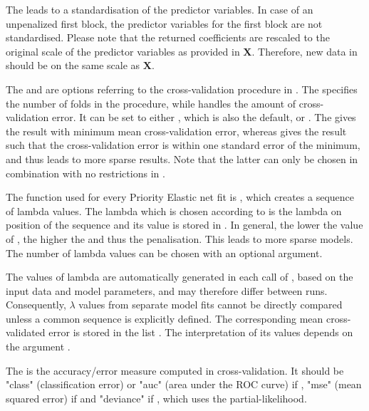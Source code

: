 The  leads to a standardisation of the predictor variables. In case of an unpenalized first block, the predictor variables for the first block are not standardised. Please note that the returned coefficients are rescaled to the original scale of the predictor variables as provided in $\mathbf{X}$. Therefore, new data in  should be on the same scale as $\mathbf{X}$.

The  and  are options referring to the cross-validation procedure in . The  specifies the number of folds in the procedure, while  handles the amount of cross-validation error. It can be set to either , which is also the default, or . The  gives the result with minimum mean cross-validation error, whereas  gives the result such that the cross-validation error is within one standard error of the minimum, and thus leads to more sparse results. Note that the latter can only be chosen in combination with no restrictions in .

The function used for every Priority Elastic net fit is , which creates a sequence of lambda values. The lambda which is chosen according to  is the lambda on position  of the sequence and its value is stored in . In general, the lower the value of , the higher the  and thus the penalisation. This leads to more sparse models. The number of lambda values can be chosen with an optional argument. 

The values of lambda are automatically generated in each call of , based on the input data and model parameters, and may therefore differ between runs. Consequently, $\lambda$ values from separate model fits cannot be directly compared unless a common sequence is explicitly defined. The corresponding mean cross-validated error is stored in the list . The interpretation of its values depends on the argument .

The  is the accuracy/error measure computed in cross-validation. It should be "class" (classification error) or "auc" (area under the ROC curve) if , "mse" (mean squared error) if  and "deviance" if , which uses the partial-likelihood.

